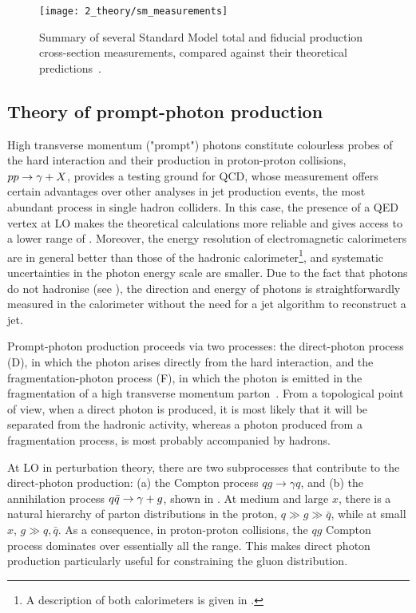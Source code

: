 \begin{figure}[ht!]
    \centering
    \texttt{[image: 2\_theory/sm\_measurements]}
    \caption{Summary of several Standard Model total and fiducial production cross-section measurements, compared against their theoretical predictions~\cite{ATLAS-SM_Measurements}.}
    \label{fig:theory:sm:hadron_interactions:sm_results}
\end{figure}



\subsection{Theory of prompt-photon production}
\label{subsec:theory:sm:prompt_photon}


High transverse momentum ("prompt") photons constitute colourless probes of the hard interaction and their  production in proton-proton collisions, \(pp \rightarrow \gamma+X\), provides a testing ground for QCD, whose measurement offers certain advantages over other analyses in jet production events, the most abundant process in single hadron colliders. In this case, the presence of a \ac{QED} vertex at \ac{LO} makes the theoretical calculations more reliable and gives access to a lower range of \pt. Moreover, the energy resolution of electromagnetic calorimeters are in general better than those of the hadronic calorimeter\footnote{A description of both calorimeters is given in \Ch{\ref{ch:atlas}}.}, and systematic uncertainties in the photon energy scale are smaller. Due to the fact that photons do not hadronise (see \Sect{\ref{subsec:theory:mc_simulation:hadronisation}}), the direction and energy of photons is straightforwardly measured in the calorimeter without the need for a jet algorithm to reconstruct a jet.

Prompt-photon production proceeds via two processes: the direct-photon process (D), in which the photon arises directly from the hard interaction, and the fragmentation-photon process (F), in which the photon is emitted in the fragmentation of a high transverse momentum parton~\cite{Szczurek_Pietrycki-2007,Belghobsi_Fontannaz-2009}. From a topological point of view, when a direct photon is produced, it is most likely that it will be separated from the hadronic activity, whereas a photon produced from a fragmentation process, is most probably accompanied by hadrons.

At \ac{LO} in perturbation theory, there are two subprocesses that contribute to the direct-photon production: (a) the Compton process \(qg \to \gamma q\), and (b) the annihilation process \(q\bar{q} \rightarrow \gamma+g\), shown in \Figs{\ref{fig:theory:sm:prompt_photon:feynman_lo_direct:compton}}{\ref{fig:theory:sm:prompt_photon:feynman_lo_direct:annihilation}}. At medium and large \(x\), there is a natural hierarchy of parton distributions in the proton, \(q \gg g \gg \bar{q}\), while at small \(x\), \(g \gg q,\bar{q}\). As a consequence, in proton-proton collisions, the \(qg\) Compton process dominates over essentially all the \pt range. This makes direct photon production particularly useful for constraining the gluon distribution.

